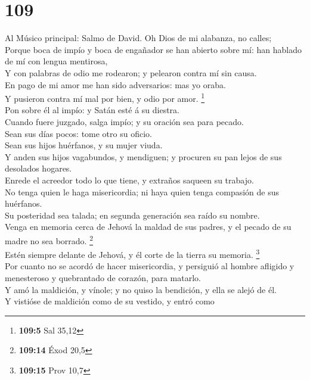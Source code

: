 \hypertarget{section-108}{%
\section{109}\label{section-108}}

 Al Músico principal: Salmo de David. Oh Dios de mi
alabanza, no calles;\\
 Porque boca de impío y boca de engañador se han abierto
sobre mí: han hablado de mí con lengua mentirosa,\\
 Y con palabras de odio me rodearon; y pelearon contra mí
sin causa.\\
 En pago de mi amor me han sido adversarios: mas yo oraba.\\
 Y pusieron contra mí mal por bien, y odio por amor.
\footnote{\textbf{109:5} Sal 35,12}\\
 Pon sobre él al impío: y Satán esté á su diestra.\\
 Cuando fuere juzgado, salga impío; y su oración sea para
pecado.\\
 Sean sus días pocos: tome otro su oficio.\\
 Sean sus hijos huérfanos, y su mujer viuda.\\
 Y anden sus hijos vagabundos, y mendiguen; y procuren su
pan lejos de sus desolados hogares.\\
 Enrede el acreedor todo lo que tiene, y extraños saqueen
su trabajo.\\
 No tenga quien le haga misericordia; ni haya quien tenga
compasión de sus huérfanos.\\
 Su posteridad sea talada; en segunda generación sea raído
su nombre.\\
 Venga en memoria cerca de Jehová la maldad de sus padres,
y el pecado de su madre no sea borrado. \footnote{\textbf{109:14} Éxod
  20,5}\\
 Estén siempre delante de Jehová, y él corte de la tierra
su memoria. \footnote{\textbf{109:15} Prov 10,7}\\
 Por cuanto no se acordó de hacer misericordia, y persiguió
al hombre afligido y menesteroso y quebrantado de corazón, para
matarlo.\\
 Y amó la maldición, y vínole; y no quiso la bendición, y
ella se alejó de él.\\
 Y vistióse de maldición como de su vestido, y entró como
